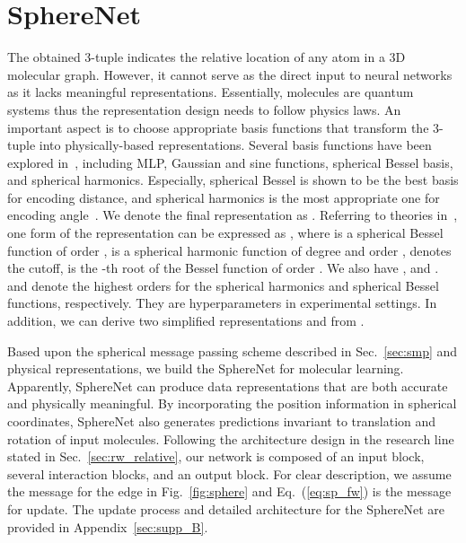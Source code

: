 \documentclass{article}
\begin{document}
\section{SphereNet} \label{sec:spherenet}
The obtained 3-tuple  indicates the relative location of 
any atom in a 3D molecular graph. However, 
it cannot serve as the direct input to neural networks as
it lacks meaningful representations.
Essentially, molecules are quantum systems thus the representation design needs to
follow physics laws.
An important aspect is to choose appropriate basis functions that 
transform the 3-tuple  into physically-based representations.
Several basis functions have been explored in~\citet{hu2021forcenet,klicpera_dimenet_2020}, including
MLP, Gaussian and sine functions, spherical Bessel basis, and spherical harmonics.
Especially, spherical Bessel is shown to be the best basis for encoding distance, and
spherical harmonics is the most appropriate
one for encoding angle~\citep{hu2021forcenet,klicpera_dimenet_2020}.
We denote the final representation as .
Referring to theories in~\citet{griffiths2018introduction,cohen2019gauge,klicpera_dimenet_2020},
one form of the representation
can be expressed as ,
where  is a spherical Bessel function of order ,
 is a spherical harmonic function of degree  and order ,
 denotes the cutoff,
 is the -th root of the
Bessel function of order .
We also have
,  and .
 and  denote
the highest orders for the spherical harmonics and spherical Bessel functions,
respectively.
They are hyperparameters in experimental settings.
In addition, we can derive two simplified representations  and 
from .


Based upon the spherical message passing scheme described in Sec.~\ref{sec:smp} and physical representations, we build the SphereNet
for molecular learning.
Apparently, SphereNet can produce data representations
that are both accurate and physically meaningful.
By incorporating the position information in
spherical coordinates,
SphereNet also generates predictions invariant to 
translation and rotation of input molecules.
\textcolor{COLOR}{Following the architecture design in the research line
stated in Sec.~\ref{sec:rw_relative},}
our network is composed of an input block,
several interaction blocks, and an output block.
For clear description, we assume the message 
 for the edge  in Fig.~\ref{fig:sphere} and Eq.~(\ref{eq:sp_fw}) is the message for update.
The update process and detailed architecture for the SphereNet are 
provided
in Appendix~\ref{sec:supp_B}.
\end{document}

